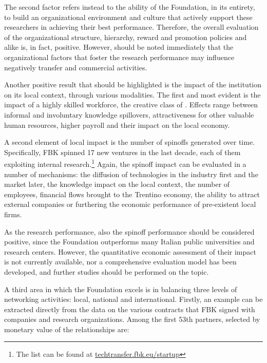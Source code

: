 The second factor refers instead to the ability of the Foundation, in its entirety, to build an organizational environment and culture that actively support these researchers in achieving their best performance. Therefore, the overall evaluation of the organizational structure, hierarchy, reward and promotion policies and alike is, in fact, positive. However, should be noted immediately that the organizational factors that foster the research performance may influence negatively transfer and commercial activities.

Another positive result that should be highlighted is the impact of the institution on its local context, through various modalities. The first and most evident is the impact of a highly skilled workforce, the creative class of \citet{Florida2002}. Effects range between informal and involuntary knowledge spillovers, attractiveness for other valuable human resources, higher payroll and their impact on the local economy. 

A second element of local impact is the number of spinoffs generated over time. Specifically, FBK spinned 17 new ventures in the last decade, each of them exploiting internal research.\footnote{The list can be found at \hyperref[https://techtransfer.fbk.eu/startup/]{techtransfer.fbk.eu/startup}}
Again, the spinoff impact can be evaluated in a number of mechanisms: the diffusion of technologies in the industry first and the market later, the knowledge impact on the local context, the number of employees, financial flows brought to the Trentino economy, the ability to attract external companies or furthering the economic performance of pre-existent local firms. 

As the research performance, also the spinoff performance should be considered positive, since the Foundation outperforms many Italian public universities and research centers. However, the quantitative economic assessment of their impact is not currently available, nor a comprehensive evaluation model has been developed, and further studies should be performed on the topic.

A third area in which the Foundation excels is in balancing three levels of networking activities: local, national and international. Firstly, an example can be extracted directly from the data on the various contracts that FBK signed with companies and research organizations. Among the first 53th partners, selected by monetary value of the relationships are:

